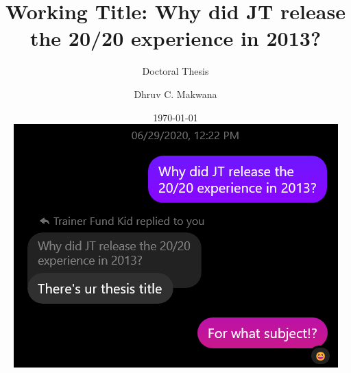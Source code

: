 
\title[Working Title: Why did JT release the 20/20 experience in 2013?]{Working Title: Why did JT release the 20/20 experience in 2013?}
\subtitle{Doctoral Thesis}
\author[D. C. Makwana]{Dhruv C. Makwana}%
\date{\today \\[\baselineskip] \includegraphics[width=.8\textwidth]{figures/working-title.png}
}


\frontmatter %


\makeatletter
\uppertitleback{\@titlehead} %

